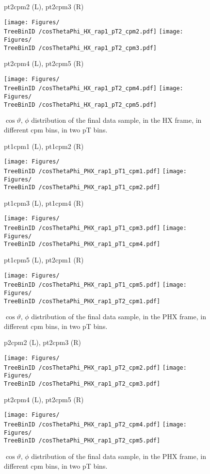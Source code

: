 \documentclass[12pt]{article}
\providecommand{\TreeBinID}[1]{TreeBinIDDefault_rap1pt1}%
\begin{document}
\begin{figure}[htbp]
\centering
\caption{pt2cpm2 (L), pt2cpm3 (R)}
\texttt{[image: Figures/\\TreeBinID /cosThetaPhi\_HX\_rap1\_pT2\_cpm2.pdf]}
\texttt{[image: Figures/\\TreeBinID /cosThetaPhi\_HX\_rap1\_pT2\_cpm3.pdf]}
\caption{pt2cpm4 (L), pt2cpm5 (R)}
\texttt{[image: Figures/\\TreeBinID /cosThetaPhi\_HX\_rap1\_pT2\_cpm4.pdf]}
\texttt{[image: Figures/\\TreeBinID /cosThetaPhi\_HX\_rap1\_pT2\_cpm5.pdf]}
\caption{$\cos\vartheta,\,\phi$ distribution of the final data sample, in the HX
frame, in different cpm bins, in two pT bins.}
\end{figure}
\clearpage



\begin{figure}[htbp]
\centering
\caption{pt1cpm1 (L), pt1cpm2 (R)}
\texttt{[image: Figures/\\TreeBinID /cosThetaPhi\_PHX\_rap1\_pT1\_cpm1.pdf]}
\texttt{[image: Figures/\\TreeBinID /cosThetaPhi\_PHX\_rap1\_pT1\_cpm2.pdf]}
\caption{pt1cpm3 (L), pt1cpm4 (R)}
\texttt{[image: Figures/\\TreeBinID /cosThetaPhi\_PHX\_rap1\_pT1\_cpm3.pdf]}
\texttt{[image: Figures/\\TreeBinID /cosThetaPhi\_PHX\_rap1\_pT1\_cpm4.pdf]}
\caption{pt1cpm5 (L), pt2cpm1 (R)}
\texttt{[image: Figures/\\TreeBinID /cosThetaPhi\_PHX\_rap1\_pT1\_cpm5.pdf]}
\texttt{[image: Figures/\\TreeBinID /cosThetaPhi\_PHX\_rap1\_pT2\_cpm1.pdf]}
\caption{$\cos\vartheta,\,\phi$ distribution of the final data sample, in the PHX
frame, in different cpm bins, in two pT bins.}
\end{figure}
\clearpage

\begin{figure}[htbp]
\centering
\caption{p2cpm2 (L), pt2cpm3 (R)}
\texttt{[image: Figures/\\TreeBinID /cosThetaPhi\_PHX\_rap1\_pT2\_cpm2.pdf]}
\texttt{[image: Figures/\\TreeBinID /cosThetaPhi\_PHX\_rap1\_pT2\_cpm3.pdf]}
\caption{pt2cpm4 (L), pt2cpm5 (R)}
\texttt{[image: Figures/\\TreeBinID /cosThetaPhi\_PHX\_rap1\_pT2\_cpm4.pdf]}
\texttt{[image: Figures/\\TreeBinID /cosThetaPhi\_PHX\_rap1\_pT2\_cpm5.pdf]}
\caption{$\cos\vartheta,\,\phi$ distribution of the final data sample, in the PHX
frame, in different cpm bins, in two pT bins.}
\end{figure}
\clearpage
\end{document}
